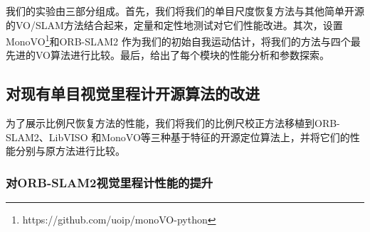 我们的实验由三部分组成。首先，我们将我们的单目尺度恢复方法与其他简单开源的VO/SLAM方法结合起来，定量和定性地测试对它们性能改进。其次，设置MonoVO\footnote{https://github.com/uoip/monoVO-python}和ORB-SLAM2 \cite{raul2015orb}作为我们的初始自我运动估计，将我们的方法与四个最先进的VO算法进行比较。最后，给出了每个模块的性能分析和参数探索。

\subsection{对现有单目视觉里程计开源算法的改进}
为了展示比例尺恢复方法的性能，我们将我们的比例尺校正方法移植到ORB-SLAM2、LibVISO \cite{Geiger2011IV}和MonoVO等三种基于特征的开源定位算法上，并将它们的性能分别与原方法进行比较。

\subsubsection{对ORB-SLAM2视觉里程计性能的提升}
\label{sec:eva_scale_recovery}

